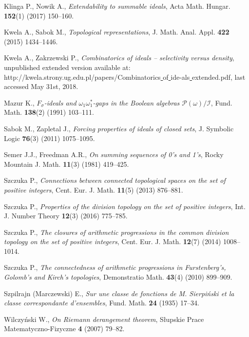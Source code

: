 \documentclass{amsart}
\theoremstyle{definition}
\begin{document}
\begin{thebibliography}{abc}
Klinga P., Nowik A., \emph{Extendability to summable ideals},
Acta Math. Hungar. {\bf 152}(1) (2017) 150--160.

Kwela A., Sabok M., \emph{Topological representations},
J. Math. Anal. Appl. {\bf 422} (2015) 1434--1446.

Kwela A., Zakrzewski P., \emph{Combinatorics of ideals -- selectivity versus density}, unpublished extended version available at:
http://kwela.strony.ug.edu.pl/papers/Combinatorics\underline{ }of\underline{ }ide-als\underline{ }extended.pdf,
last accessed May 31st, 2018.

Mazur K., \emph{$F_\sigma$-ideals and $\omega_1\omega_1^*$-gaps in the Boolean algebras $\mathcal{P}(\omega)/\mathcal{I}$},
Fund. Math. {\bf 138}(2) (1991) 103--111.

Sabok M., Zapletal J., \emph{Forcing properties of ideals of closed sets}, 
J. Symbolic Logic {\bf 76}(3) (2011) 1075--1095.

Semer J.J., Freedman A.R., \emph{On summing sequences of 0's and 1's},
Rocky Mountain J. Math. {\bf 11}(3) (1981) 419--425.

Szczuka P., \emph{Connections between connected topological spaces on the set of positive integers}, 
Cent. Eur. J. Math. {\bf 11}(5) (2013) 876--881.

Szczuka P., \emph{Properties of the division topology on the set of positive integers},
Int. J. Number Theory {\bf 12}(3) (2016) 775--785.

Szczuka P., \emph{The closures of arithmetic progressions in the common division topology on the set of positive integers},
Cent. Eur. J. Math. {\bf 12}(7) (2014) 1008--1014.

Szczuka P., \emph{The connectedness of arithmetic progressions in Furstenberg's, Golomb's and Kirch's topologies},
Demonstratio Math. {\bf 43}(4) (2010) 899--909.

Szpilrajn (Marczewski) E., \emph{Sur une classe de fonctions de M. Sierpi\'nski et la classe correspondante d'ensembles},
Fund. Math. {\bf 24} (1935) 17--34.

Wilczy\'nski W., \emph{On Riemann derangement theorem},
S\l{}upskie Prace Matematyczno-Fizyczne {\bf 4} (2007) 79--82.

\end{thebibliography}
\end{document}
